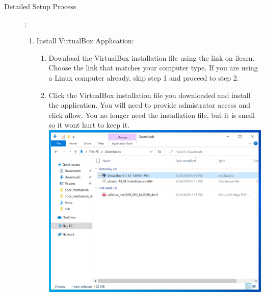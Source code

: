 \documentclass[12pt]{article}
\begin{document}
\begin{description}
  

\newpage

\item[Detailed Setup Process ]: \vspace{0mm} \\

	\begin{enumerate} 
	
	
	
	
\item Install VirtualBox Application: \\

\begin{enumerate} 
	
\item Download the VirtualBox installation file using the link on ilearn. Choose the link that matches your computer type. If you are using a Linux computer already, skip step 1 and proceed to step 2. \vspace{5mm}

\item Click the VirtualBox installation file you downloaded and install the application. You will need to provide admistrator access and click allow. You no longer need the installation file, but it is small so it wont hurt to keep it. \vspace{5mm} \\

\hspace*{-2.5cm}\includegraphics[scale=.6]{Capture1.png}\\

\end{enumerate}
  

\end{enumerate}
\end{description}
\end{document}
